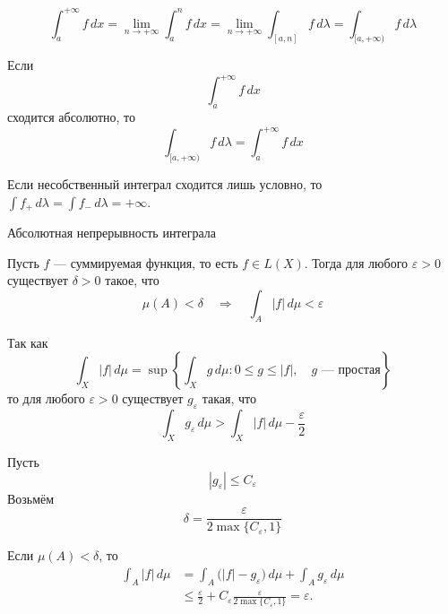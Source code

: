 \documentclass[12pt,a4paper]{article}
\begin{document}
\begin{proofbox}{}

    \[
        \int_a^{+\infty}f\,dx
        =
        \lim_{n\to+\infty}\int_a^n f\,dx
        =
        \lim_{n\to+\infty}\int_{[a,n]}f\,d\lambda
        =
        \int_{[a,+\infty)}f\,d\lambda
    \]

\end{proofbox}

\begin{corollary}

    Если
    \[
        \int_a^{+\infty}f\,dx
    \]
    сходится абсолютно, то
    \[
        \int_{[a,+\infty)}f\,d\lambda
        =
        \int_a^{+\infty}f\,dx
    \]

    Если несобственный интеграл сходится лишь условно, то $\int f_+\,d\lambda=\int f_-\,d\lambda=+\infty$.

\end{corollary}

\begin{theorem}{Абсолютная непрерывность интеграла}

    Пусть $f$ --- суммируемая функция, то есть $f\in L(X)$. Тогда для любого $\varepsilon>0$ существует $\delta>0$ такое, что
    \[
        \mu(A)<\delta
        \quad\Longrightarrow\quad
        \int_A|f|\,d\mu<\varepsilon
    \]

\end{theorem}

\begin{proofbox}{}

    Так как
    \[
        \int_X|f|\,d\mu
        =
        \sup\left\{
        \int_X g\,d\mu:
        0\leq g\leq|f|,
        \quad g\text{ --- простая}
        \right\}
    \]
    то для любого $\varepsilon>0$ существует $g_\varepsilon$ такая, что
    \[
        \int_X g_\varepsilon\,d\mu
        >
        \int_X|f|\,d\mu-\frac{\varepsilon}{2}
    \]

    Пусть
    \[
        |g_\varepsilon|\leq C_\varepsilon
    \]
    Возьмём
    \[
        \delta=\frac{\varepsilon}{2\max\{C_\varepsilon,1\}}
    \]

    Если $\mu(A)<\delta$, то
    \[
        \begin{aligned}
            \int_A|f|\,d\mu
            &=
            \int_A\bigl(|f|-g_\varepsilon\bigr)\,d\mu
            +
            \int_Ag_\varepsilon\,d\mu
            \\
            &\leq
            \frac{\varepsilon}{2}
            +
            C_\varepsilon\frac{\varepsilon}{2\max\{C_\varepsilon,1\}}
            =
            \varepsilon.
        \end{aligned}
    \]

\end{proofbox}
\end{document}
